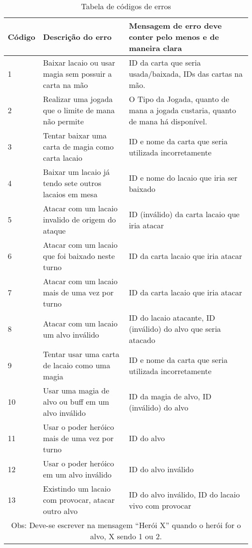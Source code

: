 \documentclass[10pt]{article}
\begin{document}
\renewcommand{\arraystretch}{1.05}
\begin{table}[t]
\centering
\caption{Tabela de códigos de erros}
\label{tab:erros}
\begin{tabular}{|l|p{4cm}|p{10cm}|}
\hline
Código & Descrição do erro & Mensagem de erro deve conter \textbf{pelo menos} e de maneira clara \\ \hline
1 & Baixar lacaio ou usar magia sem possuir a carta na mão & ID da carta que seria usada/baixada, IDs das cartas na mão. \\ \hline
2 & Realizar uma jogada que o limite de mana não permite & O Tipo da Jogada, quanto de mana a jogada custaria, quanto de mana há disponível. \\ \hline
3 & Tentar baixar uma carta de magia como carta lacaio & ID e nome da carta que seria utilizada incorretamente \\ \hline
4 & Baixar um lacaio já tendo sete outros lacaios em mesa & ID e nome do lacaio que iria ser baixado \\ \hline
5 & Atacar com um lacaio invalido de origem do ataque & ID (inválido) da carta lacaio que iria atacar \\ \hline
6 & Atacar com um lacaio que foi baixado neste turno & ID da carta lacaio que iria atacar \\ \hline
7 & Atacar com um lacaio mais de uma vez por turno & ID da carta lacaio que iria atacar\\ \hline
8 & Atacar com um lacaio um alvo inválido & ID do lacaio atacante, ID (inválido) do alvo que seria atacado \\ \hline
9 & Tentar usar uma carta de lacaio como uma magia & ID e nome da carta que seria utilizada incorretamente \\ \hline
10 & Usar uma magia de alvo ou buff em um alvo inválido & ID da magia de alvo, ID (inválido) do alvo \\ \hline
11 & Usar o poder heróico mais de uma vez por turno & ID do alvo \\ \hline
12 & Usar o poder heróico em um alvo inválido & ID do alvo inválido \\ \hline
13 & Existindo um lacaio com provocar, atacar outro alvo & ID do alvo inválido, ID do lacaio vivo com provocar \\ \hline
\multicolumn{3}{c}{Obs: Deve-se escrever na mensagem ``Herói X'' quando o herói for o alvo, X sendo 1 ou 2.}
\end{tabular}
\end{table}
\end{document}

